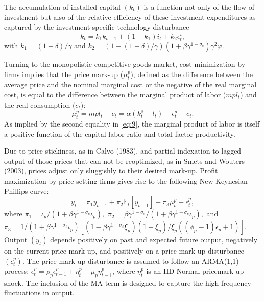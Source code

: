 \documentclass[11pt]{article}
\newcommand{\E}{\mathbb{E}}
\newcommand{\iobs}[1]{i_{#1}}
\newcommand{\wobs}[1]{c_{#1}}
\newcommand{\lobs}[1]{l_{#1}}
\newcommand{\piobs}[1]{y_{#1}}
\newcommand{\investment}{investment}
\newcommand{\labor}{labor}
\newcommand{\wage}{consumption}
\newcommand{\price}{price}
\newcommand{\prices}{prices}
\newcommand{\inflation}{output}
\newcommand{\Inflation}{Output}
\begin{document}
The accumulation of installed capital \((k_t)\) is a function not only
of the flow of \investment{} but also of the relative efficiency of
these \investment{} expenditures as captured by the \investment-specific
technology disturbance \begin{equation}
  \label{eq:8}
  k_t = k_1 k_{t-1} + (1-k_1) \iobs{t} + k_2 \epsilon_{t}^i,
\end{equation} with \(k_1=(1-\delta)/\gamma\) and
\(k_2 = (1-(1-\delta)/\gamma) (1+ \beta\gamma^{1-\sigma_c})\gamma^2\varphi.\)

Turning to the monopolistic competitive goods market, cost minimization
by firms implies that the price mark-up (\(\mu_t^p\)), defined as the
difference between the average price and the nominal marginal cost or
the negative of the real marginal cost, is equal to the difference
between the marginal product of \labor{} (\(mp\lobs{t}\)) and the real
\wage{} (\(\wobs{t}\)): \begin{equation}
  \label{eq:9}
  \mu_t^p = mp\lobs{t} - \wobs{t} = \alpha(k_t^s - \lobs{t}) +
  \epsilon_t^a - \wobs{t}.
\end{equation} As implied by the second equality in \eqref{eq:9}, the
marginal product of \labor{} is itself a positive function of the
capital-\labor{} ratio and total factor productivity.

Due to \price{} stickiness, as in Calvo (1983), and partial indexation
to lagged \inflation{} of those \prices{} that can not be reoptimized,
as in Smets and Wouters (2003), \prices{} adjust only sluggishly to
their desired mark-up. Profit maximization by \price-setting firms gives
rise to the following New-Keynesian Phillips curve: \begin{equation}
  \label{eq:10}
  \piobs{t} = \pi_1\piobs{t-1} + \pi_2 \E_t[\piobs{t+1}] - \pi_3
  \mu_t^p + \epsilon_t^p,
\end{equation} where
\(\pi_1 = \iota_p / (1+ \beta\gamma^{1-\sigma_c} \iota_p),\)
\(\pi_2 = \beta \gamma^{1-\sigma_c} / (1+\beta \gamma^{1-\sigma_c} \iota_p),\)
and
\(\pi_3 = 1/(1 +\beta \gamma^{1-\sigma_c} \iota_p)[(1- \beta \gamma^{1-\sigma_c} \xi_p)(1-\xi_p) / \xi_p ((\phi_p - 1)\epsilon_p +1)].\)
\Inflation{} \((\piobs{t})\) depends positively on past and expected
future \inflation, negatively on the current \price{} mark-up, and
positively on a \price{} mark-up disturbance \((\epsilon_t^p)\). The
\price{} mark-up disturbance is assumed to follow an ARMA(1,1) process:
\(\epsilon_t^p = \rho_p \epsilon_{t-1}^p + \eta_t^p - \mu_p \eta_{t-1}^p\),
where \(\eta_t^p\) is an IID-Normal \price mark-up shock. The inclusion
of the MA term is designed to capture the high-frequency fluctuations in
\inflation.
\end{document}
